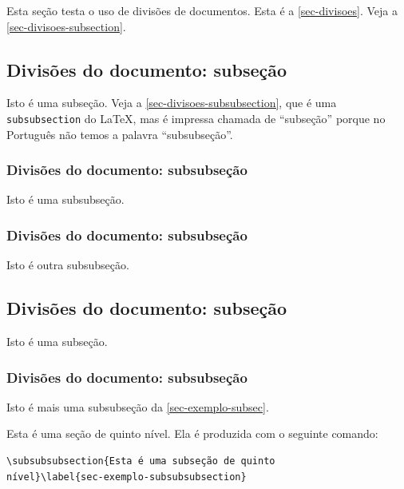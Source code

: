 Esta seção testa o uso de divisões de documentos. Esta é a
\autoref{sec-divisoes}. Veja a \autoref{sec-divisoes-subsection}.

\subsection{Divisões do documento: subseção}\label{sec-divisoes-subsection}

Isto é uma subseção. Veja a \autoref{sec-divisoes-subsubsection}, que é uma
\texttt{subsubsection} do \LaTeX, mas é impressa chamada de ``subseção'' porque
no Português não temos a palavra ``subsubseção''.

\subsubsection{Divisões do documento: subsubseção}
\label{sec-divisoes-subsubsection}

Isto é uma subsubseção.

\subsubsection{Divisões do documento: subsubseção}

Isto é outra subsubseção.

\subsection{Divisões do documento: subseção}\label{sec-exemplo-subsec}

Isto é uma subseção.

\subsubsection{Divisões do documento: subsubseção}

Isto é mais uma subsubseção da \autoref{sec-exemplo-subsec}.


\label{sec-exemplo-subsubsubsection}

Esta é uma seção de quinto nível. Ela é produzida com o seguinte comando:

\begin{verbatim}
\subsubsubsection{Esta é uma subseção de quinto
nível}\label{sec-exemplo-subsubsubsection}
\end{verbatim}

\label{sec-exemplo-subsubsubsection-outro}


